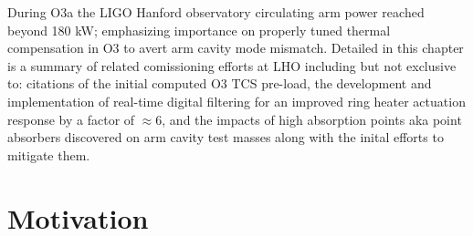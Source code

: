 



During O3a the LIGO Hanford observatory circulating arm power reached beyond 180 kW; emphasizing importance on properly tuned thermal compensation in O3 to avert arm cavity mode mismatch. Detailed in this chapter is a summary of related comissioning efforts at LHO including but not exclusive to: citations of the initial computed O3 TCS pre-load, the development and implementation of real-time digital filtering for an improved ring heater actuation response by a factor of $\approx 6$, and the impacts of high absorption points aka point absorbers discovered on arm cavity test masses along with the inital efforts to mitigate them. 

\section{Motivation}


